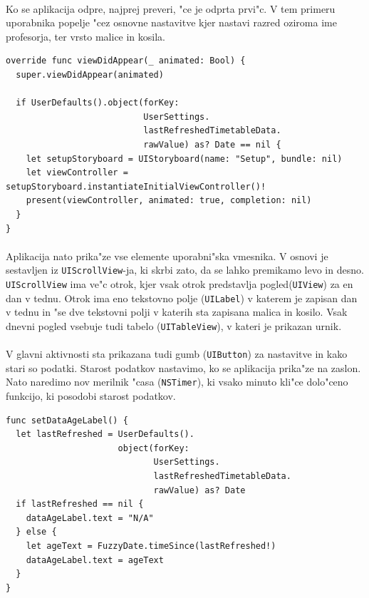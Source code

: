 \paragraph{}Ko se aplikacija odpre, najprej preveri, "ce je odprta prvi"c. V tem primeru uporabnika popelje "cez osnovne nastavitve kjer nastavi razred oziroma ime profesorja, ter vrsto malice in kosila. 

\begin{verbatim}
override func viewDidAppear(_ animated: Bool) {
  super.viewDidAppear(animated)

  if UserDefaults().object(forKey:
                           UserSettings.
                           lastRefreshedTimetableData.
                           rawValue) as? Date == nil {
    let setupStoryboard = UIStoryboard(name: "Setup", bundle: nil)
    let viewController = setupStoryboard.instantiateInitialViewController()!
    present(viewController, animated: true, completion: nil)
  }
}
\end{verbatim}

\paragraph{}
Aplikacija nato prika"ze vse elemente uporabni"ska vmesnika. V osnovi je sestavljen iz \texttt{UIScrollView}-ja, ki skrbi zato, da se lahko premikamo levo in desno. \texttt{UIScrollView} ima ve"c otrok, kjer vsak otrok predstavlja pogled(\texttt{UIView}) za en dan v tednu. Otrok ima eno tekstovno polje (\texttt{UILabel}) v katerem je zapisan dan v tednu in "se dve tekstovni polji v katerih sta zapisana malica in kosilo. Vsak dnevni pogled vsebuje tudi tabelo (\texttt{UITableView}), v kateri je prikazan urnik.

\paragraph{}
V glavni aktivnosti sta prikazana tudi gumb (\texttt{UIButton}) za nastavitve in kako stari so podatki. Starost podatkov nastavimo, ko se aplikacija prika"ze na zaslon. Nato naredimo nov merilnik "casa (\texttt{NSTimer}), ki vsako minuto kli"ce dolo"ceno funkcijo, ki posodobi starost podatkov.

\begin{verbatim}
func setDataAgeLabel() {
  let lastRefreshed = UserDefaults().
                      object(forKey:
                             UserSettings.
                             lastRefreshedTimetableData.
                             rawValue) as? Date
  if lastRefreshed == nil {
    dataAgeLabel.text = "N/A"
  } else {
    let ageText = FuzzyDate.timeSince(lastRefreshed!)
    dataAgeLabel.text = ageText
  }
}
\end{verbatim}

